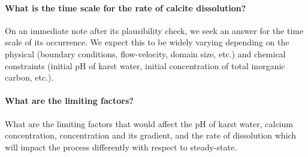 \paragraph*{What is the time scale for the rate of calcite dissolution?} On an immediate note after its plausibility check, 
we seek an answer for the time scale of its occurrence. We expect this to be widely varying depending on the physical (boundary conditions, flow-velocity, 
domain size, etc.) and chemical constraints (initial pH of karst water, initial concentration of total inorganic carbon, etc.).

\paragraph*{What are the limiting factors?} What are the limiting factors that would affect the pH of karst water, 
calcium concentration,  concentration and its gradient, and the rate of dissolution which will impact the process differently 
with respect to steady-state. 
\endinput